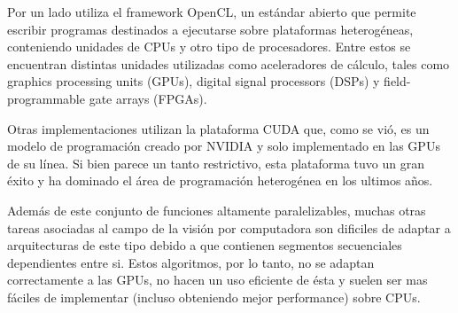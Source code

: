 \documentclass[a4paper,10pt]{report}
\begin{document}
Por un lado utiliza el framework OpenCL, un estándar abierto que permite escribir programas destinados a ejecutarse sobre plataformas heterogéneas, conteniendo unidades de CPUs y otro tipo de procesadores. Entre estos se encuentran distintas unidades utilizadas 
como aceleradores de cálculo, tales como graphics processing units (GPUs), digital signal processors (DSPs) y field-programmable gate arrays (FPGAs).

Otras implementaciones utilizan la plataforma CUDA que, como se vió, es un modelo de programación creado por NVIDIA y solo implementado en las GPUs de su línea. Si bien parece un tanto restrictivo, 
esta plataforma tuvo un gran éxito y ha dominado el área de programación heterogénea en los ultimos años.




Además de este conjunto de funciones altamente paralelizables, muchas otras tareas asociadas al campo de la visión por computadora son dificiles de adaptar
a arquitecturas de este tipo debido a que contienen segmentos secuenciales dependientes entre si.
Estos algoritmos, por lo tanto, no se adaptan correctamente a las GPUs, no hacen un uso eficiente de ésta y suelen ser mas fáciles de implementar (incluso obteniendo mejor performance) sobre CPUs.

\end{document}
